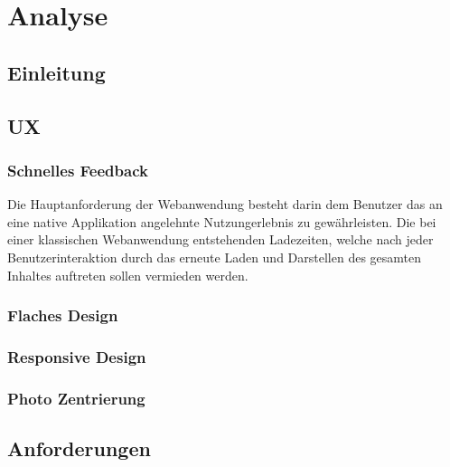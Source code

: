\chapter{Analyse}

\section{Einleitung}

\section{UX}

\subsection{Schnelles Feedback}

Die Hauptanforderung der Webanwendung besteht darin dem Benutzer das an eine
native Applikation angelehnte Nutzungerlebnis zu gewährleisten. Die bei einer
klassischen Webanwendung entstehenden Ladezeiten, welche nach jeder
Benutzerinteraktion durch das erneute Laden und Darstellen des gesamten Inhaltes
auftreten sollen vermieden werden.

\subsection{Flaches Design}

\subsection{Responsive Design}

\subsection{Photo Zentrierung}

\section{Anforderungen}

